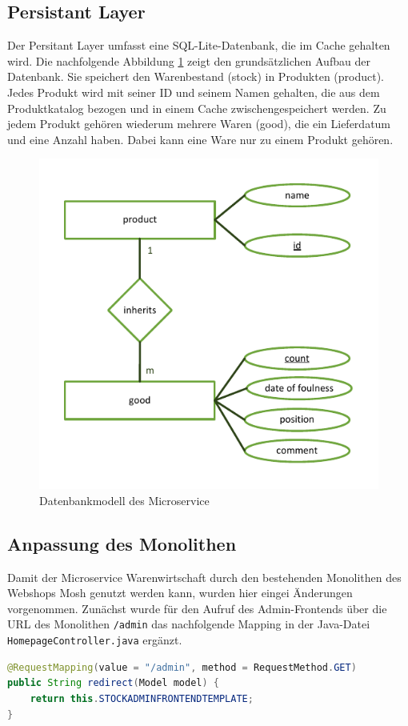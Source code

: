 \subsection{Persistant Layer}
Der Persitant Layer umfasst eine SQL-Lite-Datenbank, die im Cache gehalten wird. Die nachfolgende Abbildung \ref{pic:Datenbankmodell des Microservice} zeigt den grundsätzlichen Aufbau der Datenbank. Sie speichert den Warenbestand (stock) in Produkten (product). Jedes Produkt wird mit seiner ID und seinem Namen gehalten, die aus dem Produktkatalog bezogen und in einem Cache zwischengespeichert werden. Zu jedem Produkt gehören wiederum mehrere Waren (good), die ein Lieferdatum und eine Anzahl haben.  Dabei kann eine Ware nur zu einem Produkt gehören.

\begin{figure}[H]
	\centering
	\includegraphics[width=0.5 \textwidth]{./pics/db.pdf}
	\caption{Datenbankmodell des Microservice}
	\label{pic:Datenbankmodell des Microservice}
\end{figure}

\newpage
\subsection{Anpassung des Monolithen}
\label{subsec: Anpassung des Monolithen}
Damit der Microservice Warenwirtschaft durch den bestehenden Monolithen des Webshops Mosh genutzt werden kann, wurden hier eingei Änderungen vorgenommen. Zunächst wurde für den Aufruf des Admin-Frontends über die URL des Monolithen \texttt{/admin} das nachfolgende Mapping in der Java-Datei \texttt{HomepageController.java} ergänzt.

\begin{lstlisting}[caption=Datenabfrage von der Bestellung (Waren wurden bestellt), language=Java]
@RequestMapping(value = "/admin", method = RequestMethod.GET)
public String redirect(Model model) {
	return this.STOCKADMINFRONTENDTEMPLATE;
}
\end{lstlisting}

